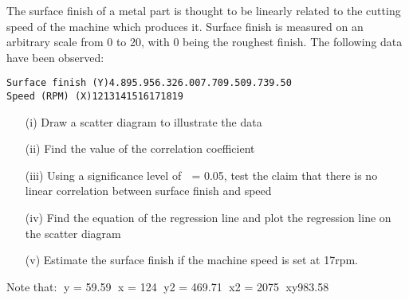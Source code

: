 
The surface finish of a metal part is thought to be linearly related to the cutting speed of the machine which produces it.  Surface finish is measured on an arbitrary scale from 0 to 20, with 0 being the roughest finish.  The following data have been observed:

\begin{verbatim}
Surface finish (Y)4.895.956.326.007.709.509.739.50
Speed (RPM) (X)1213141516171819
\end{verbatim}


\begin{itemize}
	\item[(i)]Draw a scatter diagram to illustrate the data
	\item[(ii)]Find the value of the correlation coefficient
	\item[(iii)]Using a significance level of  = 0.05, test the claim that there is no linear correlation between surface finish and speed
	\item[(iv)]Find the equation of the regression line and plot the regression line on the scatter diagram
	\item[(v)]Estimate the surface finish if the machine speed is set at 17rpm. 
\end{itemize}


Note that:
y = 59.59
x = 124
y2 = 469.71
x2 = 2075
xy983.58




